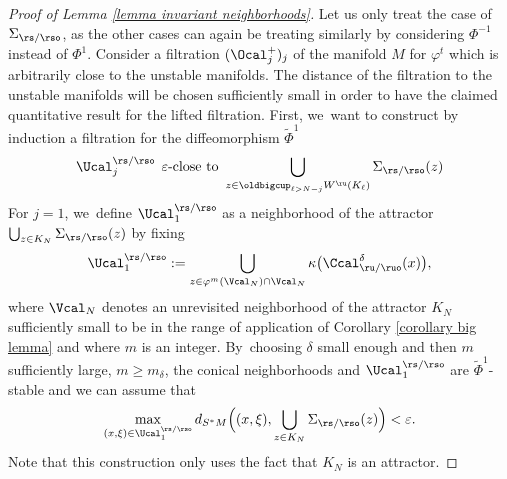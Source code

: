 \begin{proof}[Proof of Lemma \ref{lemma invariant neighborhoods}]
Let us only treat the case of $\Sigma_{\rs/\rso}$, as the other cases can again be treating similarly by considering $\Phi^{-1}$ instead of $\Phi^1$. Consider a filtration $(\Ocal_j^+)_j$ of the manifold $M$ for $\varphi^t$ which is arbitrarily close to the unstable manifolds. The distance of the filtration to the unstable manifolds will be chosen sufficiently small in order to have the claimed quantitative result for the lifted filtration. First, we~want to construct by induction a filtration for the diffeomorphism $\widetilde{\Phi}^1$
\begin{equation}\label{eq: proof lemma invariant neighborhood HR}
\Ucal_j^{\rs/\rso} \: \: \varepsilon\text{-close to } \bigcup_{z \in \oldbigcup_{\ell > N-j} W^\ru (K_\ell)} \Sigma_{\rs/\rso} (z)
\end{equation}
For $j = 1$, we~define $\Ucal_1^{\rs/\rso}$ as a neighborhood of the attractor $\bigcup_{z \in K_N} \Sigma_{\rs/\rso} (z)$ by fixing
\[
\Ucal_1^{\rs/\rso}:= \bigcup_{z \in \varphi^m (\Vcal_N) \cap \Vcal_N} \kappa \bigl(\Ccal_{\ru/\ruo}^{\delta} (x) \bigr),
\]
where $\Vcal_N$ denotes an unrevisited neighborhood of the attractor $K_N$ sufficiently small to be in the range of application of Corollary \ref{corollary big lemma} and where $m$ is an integer. By~choosing $\delta$ small enough and then $m$ sufficiently large, \ie $m \geq m_{\delta}$, the conical neighborhoods and $\Ucal_1^{\rs/\rso}$ are $\widetilde{\Phi}^1$-stable and we can assume that
\[
\max_{(x,\xi) \in \Ucal_1^{\rs/\rso}} d_{S^* M} \Bigl((x,\xi), \bigcup_{z \in K_N} \Sigma_{\rs/\rso}(z) \Bigr) < \varepsilon.
\]
Note that this construction only uses the fact that $K_N$ is an attractor.


\end{proof}
